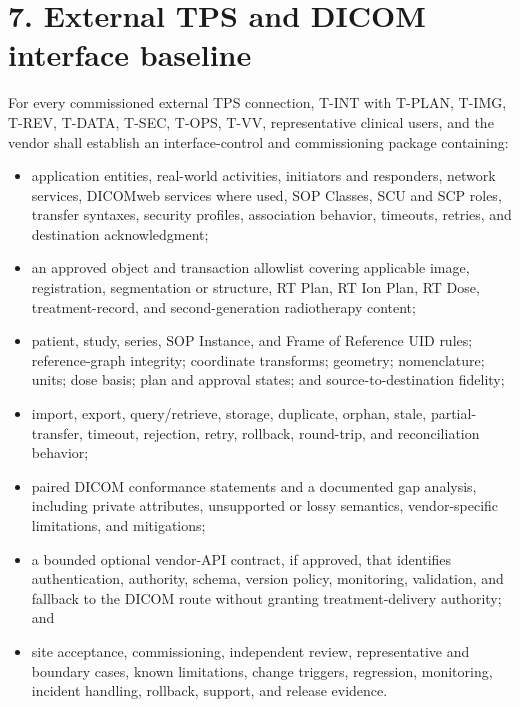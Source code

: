 \documentclass[11pt,letterpaper]{article}
\begin{document}
\section{7. External TPS and DICOM interface baseline}
For every commissioned external TPS connection, T-INT with T-PLAN, T-IMG, T-REV, T-DATA, T-SEC, T-OPS, T-VV, representative clinical users, and the vendor shall establish an interface-control and commissioning package containing:
\begin{itemize}
\item application entities, real-world activities, initiators and responders, network services, DICOMweb services where used, SOP Classes, SCU and SCP roles, transfer syntaxes, security profiles, association behavior, timeouts, retries, and destination acknowledgment;
\item an approved object and transaction allowlist covering applicable image, registration, segmentation or structure, RT Plan, RT Ion Plan, RT Dose, treatment-record, and second-generation radiotherapy content;
\item patient, study, series, SOP Instance, and Frame of Reference UID rules; reference-graph integrity; coordinate transforms; geometry; nomenclature; units; dose basis; plan and approval states; and source-to-destination fidelity;
\item import, export, query/retrieve, storage, duplicate, orphan, stale, partial-transfer, timeout, rejection, retry, rollback, round-trip, and reconciliation behavior;
\item paired DICOM conformance statements and a documented gap analysis, including private attributes, unsupported or lossy semantics, vendor-specific limitations, and mitigations;
\item a bounded optional vendor-API contract, if approved, that identifies authentication, authority, schema, version policy, monitoring, validation, and fallback to the DICOM route without granting treatment-delivery authority; and
\item site acceptance, commissioning, independent review, representative and boundary cases, known limitations, change triggers, regression, monitoring, incident handling, rollback, support, and release evidence.
\end{itemize}
\end{document}
